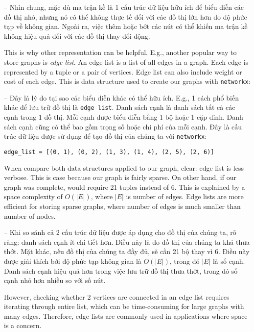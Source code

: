 \documentclass{article}
\begin{document}
\begin{itemize}
\begin{itemize}
\begin{itemize}
            -- Nhìn chung, mặc dù ma trận kề là 1 cấu trúc dữ liệu hữu ích để biểu diễn các đồ thị nhỏ, nhưng nó có thể không thực tế đối với các đồ thị lớn hơn do độ phức tạp về không gian. Ngoài ra, việc thêm hoặc bớt các nút có thể khiến ma trận kề không hiệu quả đối với các đồ thị thay đổi động.

            This is why other representation can be helpful. E.g., another popular way to store graphs is {\it edge list}. An edge list is a list of all edges in a graph. Each edge is represented by a tuple or a pair of vertices. Edge list can also include weight or cost of each edge. This is data structure used to create our graphs with {\tt networkx}:

            -- Đây là lý do tại sao các biểu diễn khác có thể hữu ích. E.g., 1 cách phổ biến khác để lưu trữ đồ thị là {\tt edge list}. Danh sách cạnh là danh sách tất cả các cạnh trong 1 đồ thị. Mỗi cạnh được biểu diễn bằng 1 bộ hoặc 1 cặp đỉnh. Danh sách cạnh cũng có thể bao gồm trọng số hoặc chi phí của mỗi cạnh. Đây là cấu trúc dữ liệu được sử dụng để tạo đồ thị của chúng ta với {\tt networkx}:
            \begin{verbatim}
edge_list = [(0, 1), (0, 2), (1, 3), (1, 4), (2, 5), (2, 6)]
            \end{verbatim}
            When compare both data structures applied to our graph, clear: edge list is less verbose. This is case because our graph is fairly sparse. On other hand, if our graph was complete, would require 21 tuples instead of 6. This is explained by a space complexity of $O(|E|)$, where $|E|$ is number of edges. Edge lists are more efficient for storing sparse graphs, where number of edges is much smaller than number of nodes.

            -- Khi so sánh cả 2 cấu trúc dữ liệu được áp dụng cho đồ thị của chúng ta, rõ ràng: danh sách cạnh ít chi tiết hơn. Điều này là do đồ thị của chúng ta khá thưa thớt. Mặt khác, nếu đồ thị của chúng ta đầy đủ, sẽ cần 21 bộ thay vì 6. Điều này được giải thích bởi độ phức tạp không gian là $O(|E|)$, trong đó $|E|$ là số cạnh. Danh sách cạnh hiệu quả hơn trong việc lưu trữ đồ thị thưa thớt, trong đó số cạnh nhỏ hơn nhiều so với số nút.

            However, checking whether 2 vertices are connected in an edge list requires iterating through entire list, which can be time-consuming for large graphs with many edges. Therefore, edge lists are commonly used in applications where space is a concern.


\end{itemize}
\end{itemize}
\end{itemize}
\end{document}
